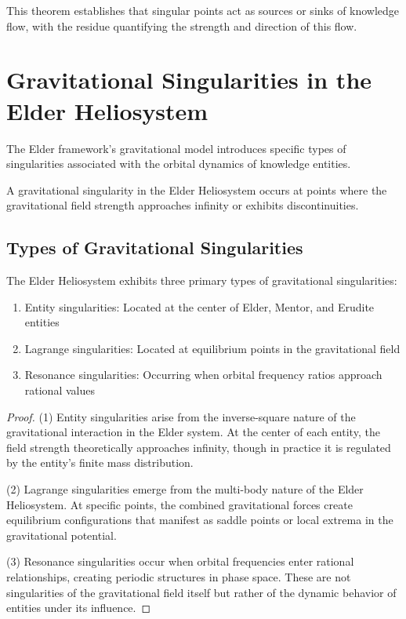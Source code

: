 This theorem establishes that singular points act as sources or sinks of knowledge flow, with the residue quantifying the strength and direction of this flow.

\section{Gravitational Singularities in the Elder Heliosystem}

The Elder framework's gravitational model introduces specific types of singularities associated with the orbital dynamics of knowledge entities.

\begin{definition}
A gravitational singularity in the Elder Heliosystem occurs at points where the gravitational field strength approaches infinity or exhibits discontinuities.
\end{definition}

\subsection{Types of Gravitational Singularities}

\begin{theorem}
The Elder Heliosystem exhibits three primary types of gravitational singularities:
\begin{enumerate}
    \item Entity singularities: Located at the center of Elder, Mentor, and Erudite entities
    \item Lagrange singularities: Located at equilibrium points in the gravitational field
    \item Resonance singularities: Occurring when orbital frequency ratios approach rational values
\end{enumerate}
\end{theorem}

\begin{proof}
(1) Entity singularities arise from the inverse-square nature of the gravitational interaction in the Elder system. At the center of each entity, the field strength theoretically approaches infinity, though in practice it is regulated by the entity's finite mass distribution.

(2) Lagrange singularities emerge from the multi-body nature of the Elder Heliosystem. At specific points, the combined gravitational forces create equilibrium configurations that manifest as saddle points or local extrema in the gravitational potential.

(3) Resonance singularities occur when orbital frequencies enter rational relationships, creating periodic structures in phase space. These are not singularities of the gravitational field itself but rather of the dynamic behavior of entities under its influence.
\end{proof}

